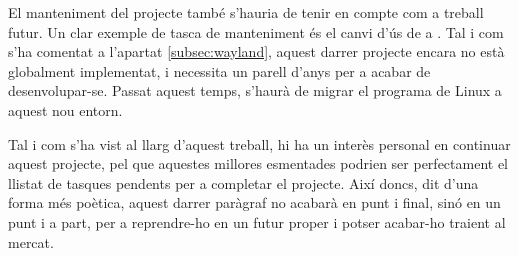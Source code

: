 El manteniment del projecte també s'hauria de tenir en compte com a treball
futur. Un clar exemple de tasca de manteniment és el canvi d'ús de 
a . Tal i com s'ha comentat a l'apartat \ref{subsec:wayland},
aquest darrer projecte encara no està globalment implementat, i necessita un
parell d'anys per a acabar de desenvolupar-se. Passat aquest temps, s'haurà
de migrar el programa de Linux a aquest nou entorn.

Tal i com s'ha vist al llarg d'aquest treball, hi ha un interès personal en
continuar aquest projecte, pel que aquestes millores esmentades podrien ser
perfectament el llistat de tasques pendents per a completar el projecte.
Així doncs, dit d'una forma més poètica, aquest darrer paràgraf no acabarà en
punt i final, sinó en un punt i a part, per a reprendre-ho en un futur proper
i potser acabar-ho traient al mercat.
